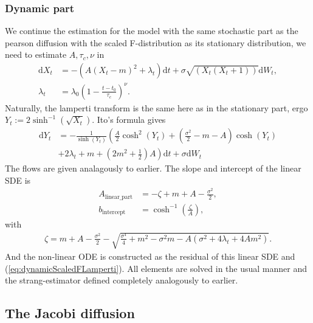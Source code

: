 \subsubsection{Dynamic part}
We continue the estimation for the model with the same stochastic part as the pearson diffusion with the scaled F-distribution as its stationary distribution, we need to estimate $A, \tau_c, \nu$ in
\begin{align}
    \mathrm{d}X_t &= -\left(A(X_t - m)^2 + \lambda_t\right)\mathrm{d}t + \sigma \sqrt{\left(X_t\left(X_t + 1\right)\right)}\mathrm{d}W_t,\\
    \lambda_t &= \lambda_0 \left(1 - \frac{t - t_0}{\tau_c}\right)^\nu.
\end{align}
Naturally, the lamperti transform is the same here as in the stationary part, ergo $Y_t := 2\sinh^{-1}\left(\sqrt{X_t}\right)$. Ito's formula gives 
\begin{align}
    \mathrm{d}Y_t &= - \frac{1}{\sinh\left(Y_t\right)}\left(\frac{A}{2}\cosh^2(Y_t) + \left(\frac{\sigma^2}{2} - m - A\right)\cosh(Y_t) \right. \nonumber \\ 
    &+\left. 2\lambda_t + m + \left(2m^2 + \frac{1}{2}\right)A\right)\mathrm{d}t + \sigma \mathrm{d}W_t \label{eq:dynamicScaledFLamperti}
\end{align}
The flows are given analagously to earlier. The slope and intercept of the linear SDE is
\begin{align}
    A_{\mathrm{linear\_part}} &= -\zeta + m + A - \frac{\sigma^2}{2},\\
    b_{\mathrm{intercept}} &= \cosh^{-1}\left(\frac{\zeta}{A}\right),
\end{align}
with
\begin{align}
    \zeta = m + A - \frac{\sigma^2}{2} - \sqrt{\frac{\sigma^4}{4} + m^2 - \sigma^2m - A\left(\sigma^2 + 4 \lambda_t + 4 A m^2\right)}.
\end{align}
And the non-linear ODE is constructed as the residual of this linear SDE and (\ref{eq:dynamicScaledFLamperti}). All elements are solved in the usual manner and the strang-estimator defined completely analogously to earlier.
\subsection{The Jacobi diffusion}
